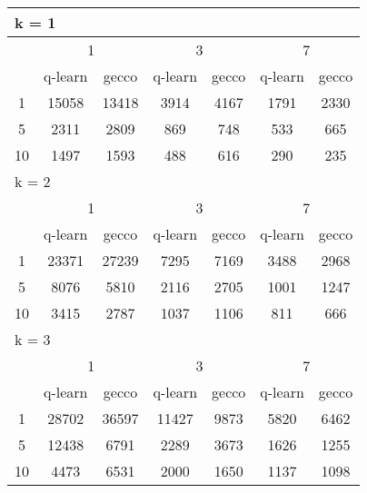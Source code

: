 \begin{table}
 \begin{tabular}{|*7{c|}}
\hline
\multicolumn{7}{|l|}{k = 1} \\
\hline
\multirow{2}{*}{\diagbox{$\mu$}{$\lambda$}} & \multicolumn{2}{c|}{1} & \multicolumn{2}{c|}{3} & \multicolumn{2}{c|}{7} \\
\cline{2-7}
 & q-learn & gecco & q-learn & gecco & q-learn & gecco \\
\hline
1 & 15058 & 13418 & 3914 & 4167 & 1791 & 2330 \\
\hline
5 & 2311 & 2809 & 869 & 748 & 533 & 665 \\
\hline
10 & 1497 & 1593 & 488 & 616 & 290 & 235 \\
\hline
\multicolumn{7}{|l|}{k = 2} \\
\hline
\multirow{2}{*}{\diagbox{$\mu$}{$\lambda$}} & \multicolumn{2}{c|}{1} & \multicolumn{2}{c|}{3} & \multicolumn{2}{c|}{7} \\
\cline{2-7}
 & q-learn & gecco & q-learn & gecco & q-learn & gecco \\
\hline
1 & 23371 & 27239 & 7295 & 7169 & 3488 & 2968 \\
\hline
5 & 8076 & 5810 & 2116 & 2705 & 1001 & 1247 \\
\hline
10 & 3415 & 2787 & 1037 & 1106 & 811 & 666 \\
\hline
\multicolumn{7}{|l|}{k = 3} \\
\hline
\multirow{2}{*}{\diagbox{$\mu$}{$\lambda$}} & \multicolumn{2}{c|}{1} & \multicolumn{2}{c|}{3} & \multicolumn{2}{c|}{7} \\
\cline{2-7}
 & q-learn & gecco & q-learn & gecco & q-learn & gecco \\
\hline
1 & 28702 & 36597 & 11427 & 9873 & 5820 & 6462 \\
\hline
5 & 12438 & 6791 & 2289 & 3673 & 1626 & 1255 \\
\hline
10 & 4473 & 6531 & 2000 & 1650 & 1137 & 1098 \\
\hline
\end{tabular}
\end{table}

